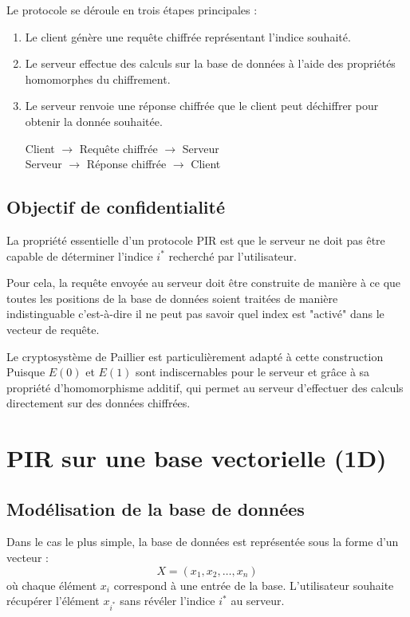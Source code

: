\documentclass[12pt,a4paper]{report}
\begin{document}
Le protocole se déroule en trois étapes principales :

\begin{enumerate}

\item Le client génère une requête chiffrée représentant l'indice souhaité.

\item Le serveur effectue des calculs sur la base de données à l'aide des propriétés homomorphes du chiffrement.

\item Le serveur renvoie une réponse chiffrée que le client peut déchiffrer pour obtenir la donnée souhaitée.

\begin{center}
Client $\rightarrow$ Requête chiffrée $\rightarrow$ Serveur  \\
Serveur $\rightarrow$ Réponse chiffrée $\rightarrow$ Client
\end{center}

\end{enumerate}


\subsection{Objectif de confidentialité}

La propriété essentielle d'un protocole PIR est que le serveur ne doit pas être capable de déterminer l'indice $i^*$ recherché par l'utilisateur.

Pour cela, la requête envoyée au serveur doit être construite de manière à ce que toutes les positions de la base de données soient traitées de manière indistinguable c'est-à-dire il ne peut pas savoir quel index est "activé" dans le vecteur de requête.

Le cryptosystème de Paillier est particulièrement adapté à cette construction Puisque $E(0)$ et $E(1)$ sont indiscernables pour le serveur et grâce à sa propriété d'homomorphisme additif, qui permet au serveur d'effectuer des calculs directement sur des données chiffrées.


\section{PIR sur une base vectorielle (1D)}

\subsection{Modélisation de la base de données}
Dans le cas le plus simple, la base de données est représentée sous la forme d'un vecteur :
\[ X = (x_1, x_2, \dots, x_n) \]
où chaque élément $x_i$ correspond à une entrée de la base. L'utilisateur souhaite récupérer l'élément $x_{i^*}$ sans révéler l'indice $i^*$ au serveur.
\end{document}

